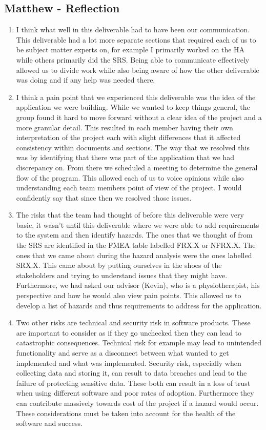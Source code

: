 \documentclass{article}
\begin{document}
\subsection*{Matthew - Reflection}
\begin{enumerate}
    \item I think what well in this deliverable had to have been our communication. This deliverable had a lot more separate sections that required each of us to be subject matter experts on, for example I primarily worked on the HA while others primarily did the SRS. Being able to communicate effectively allowed us to divide work while also being aware of how the other deliverable was doing and if any help was needed there.
    \item I think a pain point that we experienced this deliverable was the idea of the application we were building. While we wanted to keep things general, the group found it hard to move forward without a clear idea of the project and a more granular detail. This resulted in each member having their own interpretation of the project each with slight differences that it affected consistency within documents and sections. The way that we resolved this was by identifying that there was part of the application that we had discrepancy on. From there we scheduled a meeting to determine the general flow of the program. This allowed each of us to voice opinions while also understanding each team members point of view of the project. I would confidently say that since then we resolved those issues.
    \item The risks that the team had thought of before this deliverable were very basic, it wasn't until this deliverable where we were able to add requirements to the system and then identify hazards. The ones that we thought of from the SRS are identified in the FMEA table labelled FRX.X or NFRX.X. The ones that we came about during the hazard analysis were the ones labelled SRX.X. This came about by putting ourselves in the shoes of the stakeholders and trying to understand issues that they might have. Furthermore, we had asked our advisor (Kevin), who is a physiotherapist, his perspective and how he would also view pain points. This allowed us to develop a list of hazards and thus requirements to address for the application.
    \item Two other risks are technical and security risk in software products. These are important to consider as if they go unchecked then they can lead to catastrophic consequences. Technical risk for example may lead to unintended functionality and serve as a disconnect between what wanted to get implemented and what was implemented. Security risk, especially when collecting data and storing it, can result to data breaches and lead to the failure of protecting sensitive data. These both can result in a loss of trust when using different software and poor rates of adoption. Furthermore they can contribute massively towards cost of the project if a hazard would occur. These considerations must be taken into account for the health of the software and success.
    
\end{enumerate}  
\end{document}

